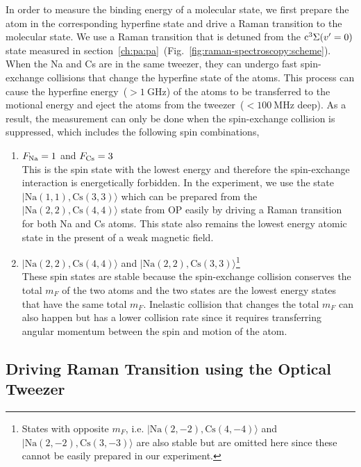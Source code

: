In order to measure the binding energy of a molecular state,
we first prepare the atom in the corresponding hyperfine state
and drive a Raman transition to the molecular state.
We use a Raman transition that is detuned from
the $\mathrm{c^3\Sigma}{\left({v'=0}\right)}$ state
measured in section~\ref{ch:pa:pa}~(Fig.~\ref{fig:raman-spectroscopy:scheme}).
When the Na and Cs are in the same tweezer,
they can undergo fast spin-exchange collisions that change the hyperfine state of the atoms.
This process can cause the hyperfine energy~($>\!1~\mathrm{GHz}$) of the atoms
to be transferred to the motional energy
and eject the atoms from the tweezer~($<\!100~\mathrm{MHz}$ deep).
As a result, the measurement can only be done when the spin-exchange collision is suppressed,
which includes the following spin combinations,
\begin{enumerate}
\item $F_{\mathrm{Na}}=1$ and $F_{\mathrm{Cs}}=3$\\
  This is the spin state with the lowest energy and therefore the spin-exchange interaction
  is energetically forbidden.
  In the experiment, we use the state $|\mathrm{Na(1, 1),Cs(3, 3)}\rangle$
  which can be prepared from the $|\mathrm{Na(2, 2),Cs(4, 4)}\rangle$ state from OP
  easily by driving a Raman transition for both Na and Cs atoms.
  This state also remains the lowest energy atomic state in the present of a weak magnetic field.
\item $|\mathrm{Na(2, 2),Cs(4, 4)}\rangle$ and $|\mathrm{Na(2, 2),Cs(3, 3)}\rangle$\footnote{
    States with opposite $m_F$, i.e.
    $|\mathrm{Na(2, -2),Cs(4, -4)}\rangle$ and $|\mathrm{Na(2, -2),Cs(3, -3)}\rangle$
    are also stable
    but are omitted here since these cannot be easily prepared in our experiment.}\\
  These spin states are stable because the spin-exchange collision conserves the total $m_F$
  of the two atoms and
  the two states are the lowest energy states that have the same total $m_F$.
  Inelastic collision that changes the total $m_F$ can also happen
  but has a lower collision rate since it requires transferring angular momentum
  between the spin and motion of the atom.
\end{enumerate}

\subsection{Driving Raman Transition using the Optical Tweezer}
\label{ch:raman-spectroscopy:states:raman-tweezer}

